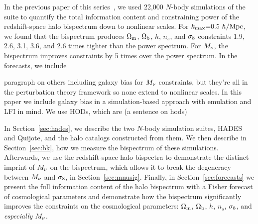 In the previous paper of this series~\citep{hahn2020}, we used 22,000 $N$-body
simulations of the \quij suite to quantify the total information content and
constraining power of the redshift-space halo bispectrum down to nonlinear scales. 
For $k_{\rm max}{=}0.5~h/{\rm Mpc}$, we found that the bispectrum produces $\Omega_{\rm m}$,
$\Omega_{\rm b}$, $h$, $n_s$, and $\sigma_8$ constraints 1.9, 2.6, 3.1, 3.6, and 2.6 times
tighter than the power spectrum. For $M_\nu$, the bispectrum improves
constraints by 5 times over the power spectrum. In the \cite{hahn2020}
forecasts, we include 


paragraph on others including galaxy bias for $M_\nu$ constraints, but they're all in the 
perturbation theory framework so none extend to nonlinear scales. In this paper we include galaxy 
bias in a simulation-based approach with emulation and LFI in mind. We use HODs, which are 
(a sentence on hods) 

In Section~\ref{sec:hades}, we describe the two $N$-body simulation suites, HADES and Quijote, 
and the halo catalogs constructed from them. We then describe in Section~\ref{sec:bk}, 
how we measure the bispectrum of these simulations. 
Afterwards, we use the redshift-space halo bispectra to demonstrate the distinct imprint of 
$M_\nu$ on the bispectrum, which allows it to break the degeneracy between 
$M_\nu$ and $\sigma_8$, in Section~\ref{sec:mnusig}. Finally, in Section~\ref{sec:forecasts} 
we present the full information content of the halo bispectrum with a Fisher forecast 
of cosmological parameters and demonstrate how the bispectrum significantly improves 
the constraints on the cosmological parameters: $\Omega_{\rm m}$, $\Omega_{\rm b}$, $h$, $n_s$, $\sigma_8$, and {\em especially} $M_\nu$. 
